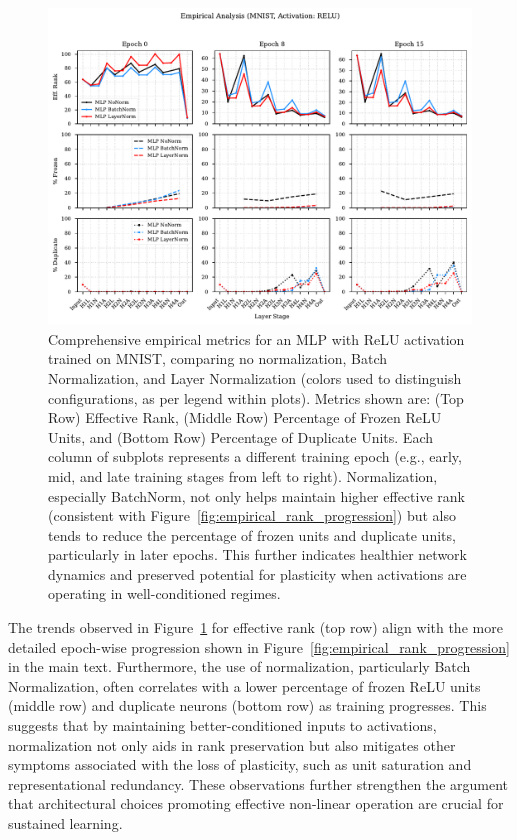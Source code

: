 \documentclass{article}
\begin{document}
\begin{figure}[h!]
    \centering
    \includegraphics[width=\textwidth]{figures/empirical_all_metrics_ReLU_MNIST.pdf}
    \caption{Comprehensive empirical metrics for an MLP with ReLU activation trained on MNIST, comparing no normalization, Batch Normalization, and Layer Normalization (colors used to distinguish configurations, as per legend within plots). Metrics shown are: (Top Row) Effective Rank, (Middle Row) Percentage of Frozen ReLU Units, and (Bottom Row) Percentage of Duplicate Units. Each column of subplots represents a different training epoch (e.g., early, mid, and late training stages from left to right). Normalization, especially BatchNorm, not only helps maintain higher effective rank (consistent with Figure~\ref{fig:empirical_rank_progression}) but also tends to reduce the percentage of frozen units and duplicate units, particularly in later epochs. This further indicates healthier network dynamics and preserved potential for plasticity when activations are operating in well-conditioned regimes.}
    \label{fig:empirical_all_metrics}
\end{figure}

The trends observed in Figure~\ref{fig:empirical_all_metrics} for effective rank (top row) align with the more detailed epoch-wise progression shown in Figure~\ref{fig:empirical_rank_progression} in the main text. Furthermore, the use of normalization, particularly Batch Normalization, often correlates with a lower percentage of frozen ReLU units (middle row) and duplicate neurons (bottom row) as training progresses. This suggests that by maintaining better-conditioned inputs to activations, normalization not only aids in rank preservation but also mitigates other symptoms associated with the loss of plasticity, such as unit saturation and representational redundancy. These observations further strengthen the argument that architectural choices promoting effective non-linear operation are crucial for sustained learning.
\end{document}
